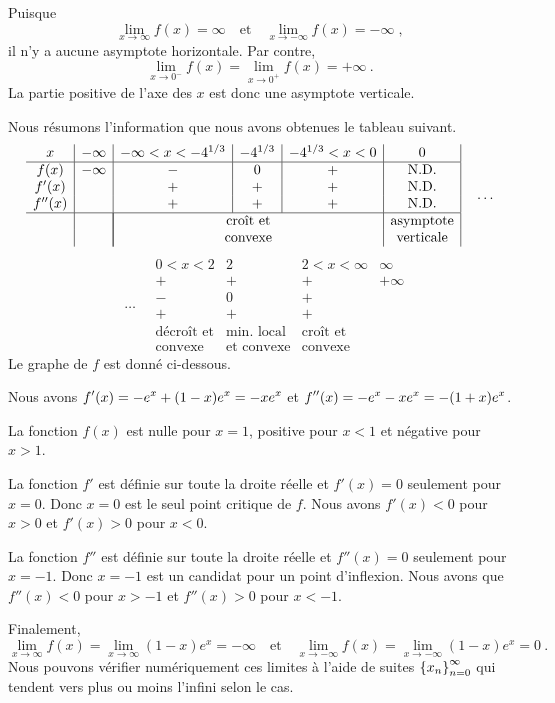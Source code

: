{Puisque
\[
\lim_{x\rightarrow \infty} f(x) = \infty  \quad \text{et} \quad
\lim_{x\rightarrow -\infty} f(x) = -\infty \; ,
\]
il n'y a aucune asymptote horizontale.  Par contre,
\[
\lim_{x\rightarrow 0^-} f(x) = \lim_{x\to 0^+} f(x) = +\infty  \ .
\]
La partie positive de l'axe des $x$ est donc une asymptote verticale.

Nous résumons l'information que nous avons obtenues le tableau suivant.
\[
\begin{array}{c|c|c|c|c|c|}
x & -\infty & -\infty<x<-4^{1/3} & -4^{1/3} & -4^{1/3}<x<0 & 0 \\
\hline
f(x) & -\infty & - & 0 & + & \text{N.D.} \\
f'(x) & & + & + & + & \text{N.D.} \\
f''(x) &  & + & + & + & \text{N.D.} \\
\hline
& & \multicolumn{3}{|c|}{\text{croît et}} & \text{asymptote} \\
& & \multicolumn{3}{|c|}{\text{convexe}} & \text{verticale}
\end{array} \quad \ldots
\]
\[ \quad \ldots  \quad
\begin{array}{|c|c|c|c}
 0<x<2 & 2 & 2<x<\infty & \infty \\
\hline
+ & + & + & +\infty \\
- & 0 & + & \\
+ & + & + & \\
\hline
\text{décroît et} & \text{min. local} & \text{croît et} & \\
\text{convexe} & \text{et convexe} & \text{convexe} &
\end{array}
\]
Le graphe de $f$ est donné ci-dessous.

 Nous avons $\displaystyle f'(x) = -e^x + (1-x)e^x = - x e^x$ et
$\displaystyle f''(x) = - e^x - x e^x = -(1+x)e^x$.

La fonction $f(x)$ est nulle pour $x=1$, positive pour $x<1$ et
négative pour $x>1$.

La fonction $f'$ est définie sur toute la droite réelle et $f'(x)=0$
seulement pour $x=0$.  Donc $x=0$ est le seul point critique de $f$.
Nous avons $f'(x) < 0$ pour $x>0$ et $f'(x) >0$ pour $x<0$.

La fonction $f''$ est définie sur toute la droite réelle et $f''(x) = 0$
seulement pour $x=-1$.  Donc $x=-1$ est un candidat pour un point
d'inflexion.  Nous avons que $f''(x) < 0$ pour $x>-1$ et $f''(x)>0$ pour $x<-1$.

Finalement,
\[
\lim_{x\rightarrow \infty} f(x) = \lim_{x\rightarrow \infty} (1-x)e^x =
-\infty
\quad \text{et} \quad 
\lim_{x\rightarrow -\infty} f(x) = \lim_{x\rightarrow -\infty}
(1-x)e^x = 0 \ .
\]
Nous pouvons vérifier numériquement ces limites à l'aide de suites
$\displaystyle \left\{x_n\right\}_{n=0}^\infty$ qui tendent vers plus ou
moins l'infini selon le cas.

}
